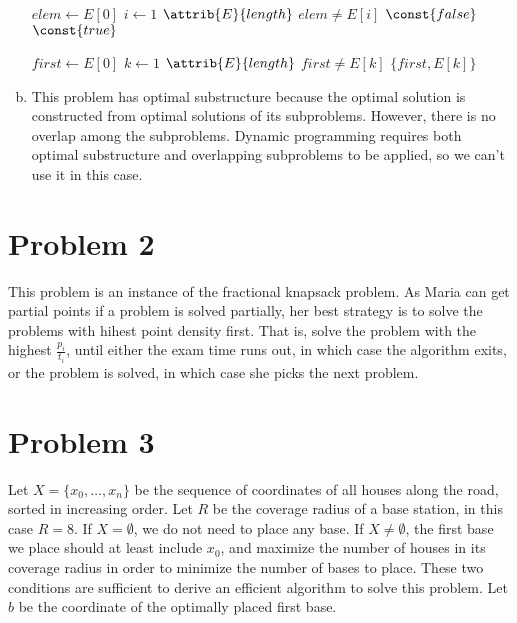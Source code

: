 \documentclass[a4paper, 10pt, twoside]{article}
\begin{document}
\begin{enumerate}[a)]
	      \begin{codebox}
		      \zi $elem \gets E[0]$
		      \zi \For $i \gets 1$ \To $\attrib{E}{length}$ \Do
		      \zi \If $elem \neq E[i]$
		      \zi \Then \Return $\const{false}$ \End \End
		      \zi \Return $\const{true}$ \End
	      \end{codebox}

	      \begin{codebox}
		      \Procname{$\proc{find-pair}(E)$}
		      \zi $first \gets E[0]$
		      \zi \For $k \gets 1$ \To $\attrib{E}{length}$ \Do
		      \zi \If $first \neq E[k]$
		      \zi \Then \Return $ \{ first, E[k] \} $ \End \End
	      \end{codebox}

	\item This problem has optimal substructure because the optimal solution is constructed from optimal solutions of its subproblems. However, there is no overlap among the subproblems. Dynamic programming requires both optimal substructure and overlapping subproblems to be applied, so we can't use it in this case. 
\end{enumerate}

\section*{Problem 2}

This problem is an instance of the fractional knapsack problem. As Maria can get partial points if a problem is solved partially, her best strategy is to solve the problems with hihest point density first. That is, solve the problem with the highest $\frac{p_i}{t_i}$, until either the exam time runs out, in which case the algorithm exits, or the problem is solved, in which case she picks the next problem.

\section*{Problem 3}

Let $X = \{ x_0, \ldots, x_n \}$ be the sequence of coordinates of all houses along the road, sorted in increasing order. Let $R$ be the coverage radius of a base station, in this case $R = 8$. If $X = \emptyset $, we do not need to place any base. If $X \neq \emptyset$, the first base we place should at least include $x_0$, and maximize the number of houses in its coverage radius in order to minimize the number of bases to place. These two conditions are sufficient to derive an efficient algorithm to solve this problem. Let $b$ be the coordinate of the optimally placed first base.
\end{document}
